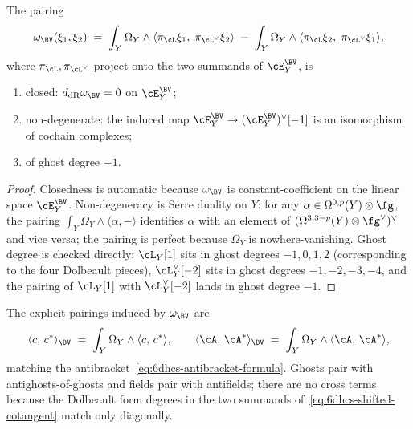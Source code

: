 \begin{proposition}
\label{prop:6dhcs-shifted-symplectic}
The pairing
\begin{equation}\label{eq:6dhcs-bv-symplectic-form}
 \omega_{\BV}(\xi_1,\xi_2)
 \;=\;
 \int_Y \Omega_Y \wedge \langle \pi_{\cL}\xi_1,\;
 \pi_{\cL^\vee}\xi_2\rangle
 \;-\;
 \int_Y \Omega_Y \wedge \langle \pi_{\cL}\xi_2,\;
 \pi_{\cL^\vee}\xi_1\rangle,
\end{equation}
where $\pi_\cL,\pi_{\cL^\vee}$ project onto the two summands of
$\cE^{\BV}_Y$, is
\begin{enumerate}[label=(\roman*)]
\item closed: $d_{\mathrm{dR}}\omega_{\BV} = 0$ on $\cE^{\BV}_Y$;
\item non-degenerate: the induced map
$\cE^{\BV}_Y\to(\cE^{\BV}_Y)^\vee[-1]$ is an isomorphism of cochain
complexes;
\item of ghost degree $-1$.
\end{enumerate}
\end{proposition}

\begin{proof}
Closedness is automatic because
$\omega_{\BV}$ is constant-coefficient on the linear space
$\cE^{\BV}_Y$. Non-degeneracy is Serre duality on $Y$: for any
$\alpha\in\Omega^{0,p}(Y)\otimes\fg$, the pairing
$\int_Y\Omega_Y\wedge\langle\alpha,-\rangle$ identifies
$\alpha$ with an element of $(\Omega^{3,3-p}(Y)\otimes\fg^\vee)^\vee$
and vice versa; the pairing is perfect because $\Omega_Y$ is
nowhere-vanishing. Ghost degree is checked directly: $\cL_Y[1]$
sits in ghost degrees $-1,0,1,2$ (corresponding to the four
Dolbeault pieces), $\cL_Y^\vee[-2]$ sits in ghost degrees
$-1,-2,-3,-4$, and the pairing of $\cL_Y[1]$ with $\cL_Y^\vee[-2]$
lands in ghost degree $-1$.
\end{proof}

\begin{remark}
\label{rem:6dhcs-antifield-pairing}
The explicit pairings induced by $\omega_{\BV}$ are
\begin{equation}\label{eq:6dhcs-antifield-pairings}
 \langle c,\,c^*\rangle_{\BV}
 \;=\;
 \int_Y \Omega_Y\wedge\langle c,\,c^*\rangle,
 \qquad
 \langle\cA,\,\cA^*\rangle_{\BV}
 \;=\;
 \int_Y\Omega_Y\wedge\langle\cA,\,\cA^*\rangle,
\end{equation}
matching the antibracket~\eqref{eq:6dhcs-antibracket-formula}.
Ghosts pair with antighosts-of-ghosts and fields pair with
antifields; there are no cross terms because the Dolbeault form
degrees in the two summands of~\eqref{eq:6dhcs-shifted-cotangent}
match only diagonally.
\end{remark}

